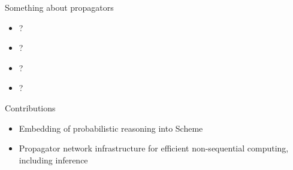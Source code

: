 \documentclass{beamer}
\begin{document}
\begin{frame}
\begin{center}\Huge Something about propagators\end{center}
\begin{itemize}
\item ?
\item ?
\item ?
\item ?
\end{itemize}
\end{frame}

\begin{frame}
\begin{center}\Huge Contributions\end{center}
\begin{itemize}
\item Embedding of probabilistic reasoning into Scheme
\item Propagator network infrastructure for efficient non-sequential
  computing, including inference
\end{itemize}
\end{frame}
\end{document}
